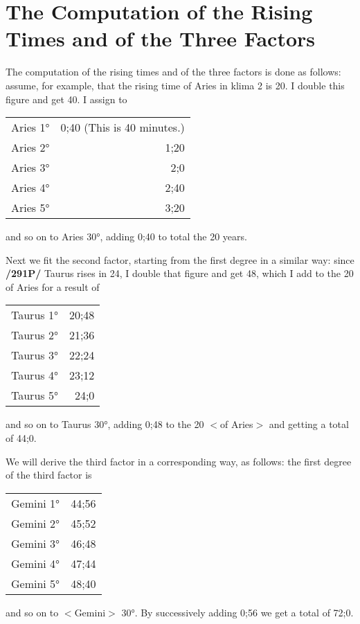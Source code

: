 \section{The Computation of the Rising Times and of the Three Factors}

The computation of the rising times and of the three factors is done as follows: assume, for example, that the rising time of Aries in klima 2 is 20. I double this figure and get 40. I assign to

\begin{tabular}{lr}
Aries 1° & 0;40 (This is 40 minutes.) \\
Aries 2° & 1;20 \\
Aries 3° & 2;0 \\
Aries 4° & 2;40 \\
Aries 5° & 3;20 \\
\end{tabular}

and so on to Aries 30°, adding 0;40 to total the 20 years.

Next we fit the second factor, starting from the first degree in a similar way: since \textbf{/291P/} Taurus rises in 24, I double that figure and get 48, which I add to the 20 of Aries for a result of 

\begin{tabular}{lr}
Taurus 1° & 20;48 \\
Taurus 2° & 21;36 \\
Taurus 3° & 22;24 \\
Taurus 4° & 23;12 \\
Taurus 5° & 24;0 \\
\end{tabular}

and so on to Taurus 30°, adding 0;48 to the 20 $<$of Aries$>$ and getting a total of 44;0.

We will derive the third factor in a corresponding way, as follows: the first degree of the third factor is

\begin{tabular}{lr}
Gemini 1° & 44;56 \\
Gemini 2° & 45;52 \\
Gemini 3° & 46;48 \\
Gemini 4° & 47;44 \\
Gemini 5° & 48;40 \\
\end{tabular}

and so on to $<$Gemini$>$ 30°. By successively adding 0;56 we get a total of 72;0.

